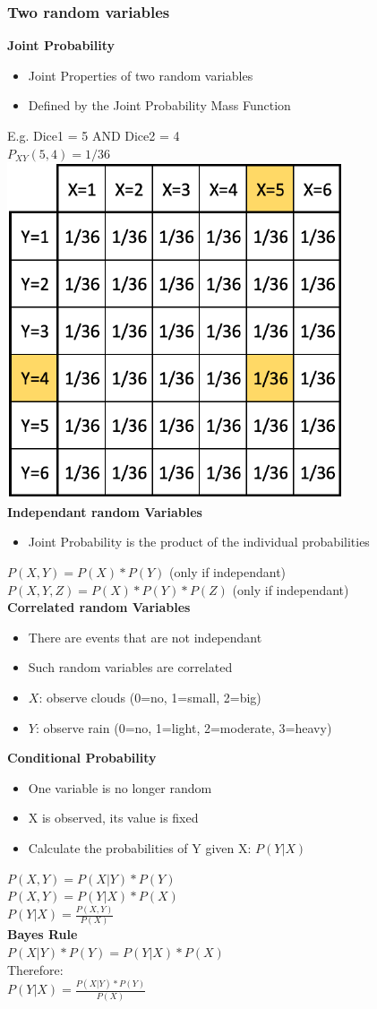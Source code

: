 \subsubsection{Two random variables}
\textbf{Joint Probability}
\begin{itemize}
    \item Joint Properties of two random variables
    \item Defined by the Joint Probability Mass Function
\end{itemize}
E.g. Dice1 = 5 AND Dice2 = 4\\
$P_{XY}(5,4) = 1/36$\\ 
\includegraphics[width=0.5\linewidth]{./img/joint_probability.png} \\
\textbf{Independant random Variables}
\begin{itemize}
    \item Joint Probability is the product of the individual probabilities
\end{itemize}
$P(X,Y) = P(X) * P(Y)$ (only if independant)\\ 
$P(X,Y,Z) = P(X) * P(Y) * P(Z)$ (only if independant)\\
\textbf{Correlated random Variables}
\begin{itemize}
    \item There are events that are not independant
    \item Such random variables are correlated
    \item $X$: observe clouds (0=no, 1=small, 2=big)
    \item $Y$: observe rain (0=no, 1=light, 2=moderate, 3=heavy)
\end{itemize}
\textbf{Conditional Probability}
\begin{itemize}
    \item One variable is no longer random
    \item X is observed, its value is fixed
    \item Calculate the probabilities of Y given X: $P(Y | X)$
\end{itemize}
$P(X, Y) = P(X | Y) * P(Y)$\\ 
$P(X, Y) = P(Y | X) * P(X)$\\
$P(Y | X) = \frac{P(X,Y)}{P(X)}$\\ 
\textbf{Bayes Rule}\\
$P(X|Y)*P(Y) = P(Y|X)*P(X)$\\ 
Therefore:\\
$P(Y|X) = \frac{P(X|Y)*P(Y)}{P(X)}$